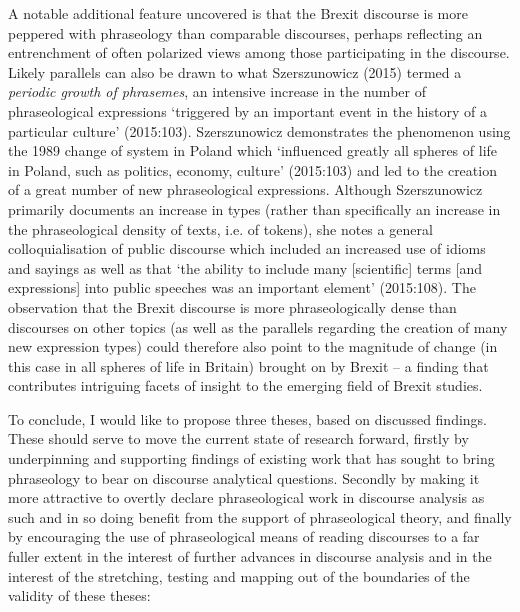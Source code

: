 \documentclass[12pt]{article}
\newenvironment{styleStandard}{\setlength\leftskip{0cm}\setlength\rightskip{0cm plus 1fil}\setlength\parindent{0cm}\setlength\parfillskip{0pt plus 1fil}\setlength\parskip{0in plus 1pt}\writerlistparindent\writerlistleftskip\leavevmode\normalfont\normalsize\writerlistlabel\ignorespaces}{\unskip\vspace{0.111in plus 0.0111in}\par}
\newcommand\writerlistleftskip{}
\newcommand\writerlistparindent{}
\newcommand\writerlistlabel{}
\begin{document}
\begin{styleStandard}
A notable additional feature uncovered is that the Brexit discourse is more peppered with phraseology than comparable discourses, perhaps reflecting an entrenchment of often polarized views among those participating in the discourse. Likely parallels can also be drawn to what Szerszunowicz (2015) termed a \textit{periodic growth of phrasemes}, an intensive increase in the number of phraseological expressions ‘triggered by an important event in the history of a particular culture’ (2015:103). Szerszunowicz demonstrates the phenomenon using the 1989 change of system in Poland which ‘influenced greatly all spheres of life in Poland, such as politics, economy, culture’ (2015:103) and led to the creation of a great number of new phraseological expressions. Although Szerszunowicz primarily documents an increase in types (rather than specifically an increase in the phraseological density of texts, i.e. of tokens), she notes a general colloquialisation of public discourse which included an increased use of idioms and sayings as well as that ‘the ability to include many [scientific] terms [and expressions] into public speeches was an important element’ (2015:108). The observation that the Brexit discourse is more phraseologically dense than discourses on other topics (as well as the parallels regarding the creation of many new expression types) could therefore also point to the magnitude of change (in this case in all spheres of life in Britain) brought on by Brexit – a finding that contributes intriguing facets of insight to the emerging field of Brexit studies.
\end{styleStandard}

\begin{styleStandard}
To conclude, I would like to propose three theses, based on discussed findings. These should serve to move the current state of research forward, firstly by underpinning and supporting findings of existing work that has sought to bring phraseology to bear on discourse analytical questions. Secondly by making it more attractive to overtly declare phraseological work in discourse analysis as such and in so doing benefit from the support of phraseological theory, and finally by encouraging the use of phraseological means of reading discourses to a far fuller extent in the interest of further advances in discourse analysis and in the interest of the stretching, testing and mapping out of the boundaries of the validity of these theses:
\end{styleStandard}
\end{document}
